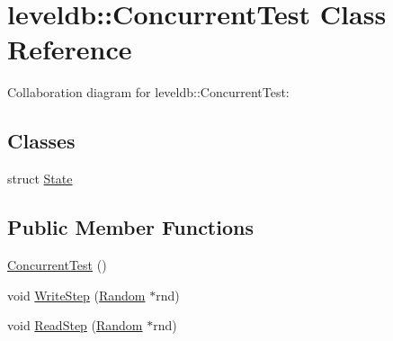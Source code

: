 \hypertarget{classleveldb_1_1_concurrent_test}{\section{leveldb\-:\-:Concurrent\-Test Class Reference}
\label{classleveldb_1_1_concurrent_test}
}


Collaboration diagram for leveldb\-:\-:Concurrent\-Test\-:
\subsection*{Classes}
\begin{DoxyCompactItemize}
\item 
struct \hyperlink{structleveldb_1_1_concurrent_test_1_1_state}{State}
\end{DoxyCompactItemize}
\subsection*{Public Member Functions}
\begin{DoxyCompactItemize}
\item 
\hyperlink{classleveldb_1_1_concurrent_test_acd93a8fa57d9a10871ec24c419f5ea88}{Concurrent\-Test} ()
\item 
void \hyperlink{classleveldb_1_1_concurrent_test_a43dc8afb9124c364d6e97dc3d421131f}{Write\-Step} (\hyperlink{classleveldb_1_1_random}{Random} $\ast$rnd)
\item 
void \hyperlink{classleveldb_1_1_concurrent_test_a9dcaf11ec747ad37150526f891627c50}{Read\-Step} (\hyperlink{classleveldb_1_1_random}{Random} $\ast$rnd)
\end{DoxyCompactItemize}
